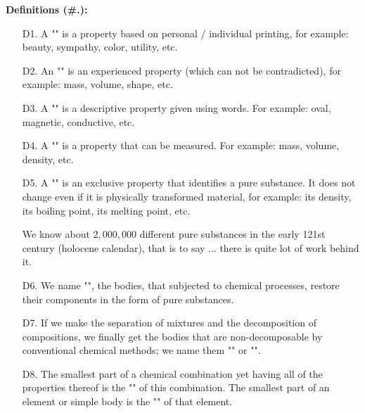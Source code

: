 	\textbf{Definitions (\#\thesection.\mydef):}	
	\begin{enumerate}
		\item[D1.] A "" is a property based on personal / individual printing, for example: beauty, sympathy, color, utility, etc.
		
		\item[D2.] An "" is an experienced property (which can not be contradicted), for example: mass, volume, shape, etc.
		
		\item[D3.] A "" is a descriptive property given using words. For example: oval, magnetic, conductive, etc.
		
		\item[D4.] A "" is a property that can be measured. For example: mass, volume, density, etc.
		
		\item[D5.] A "" is an exclusive property that identifies a pure substance. It does not change even if it is physically transformed material, for example: its density, its boiling point, its melting point, etc.
		
		\begin{tcolorbox}[title=Remark,arc=10pt,breakable,drop lifted shadow,
  skin=enhanced,
  skin first is subskin of={enhancedfirst}{arc=10pt,no shadow},
  skin middle is subskin of={enhancedmiddle}{arc=10pt,no shadow},
  skin last is subskin of={enhancedlast}{drop lifted shadow}]
	We know about $2,000,000$ different pure substances in the early 121st century (holocene calendar), that is to say ... there is quite lot of work behind it.
		\end{tcolorbox}
		
		\item[D6.] We name "", the bodies, that subjected to chemical processes, restore their components in the form of pure substances.
		
		\item[D7.] If we make the separation of mixtures and the decomposition of compositions, we finally get the bodies that are non-decomposable by conventional chemical methods; we name them "" or "".
		
		\item[D8.] The smallest part of a chemical combination yet having all of the properties thereof is the "" of this combination. The smallest part of an element or simple body is the "" of that element.
	\end{enumerate}
